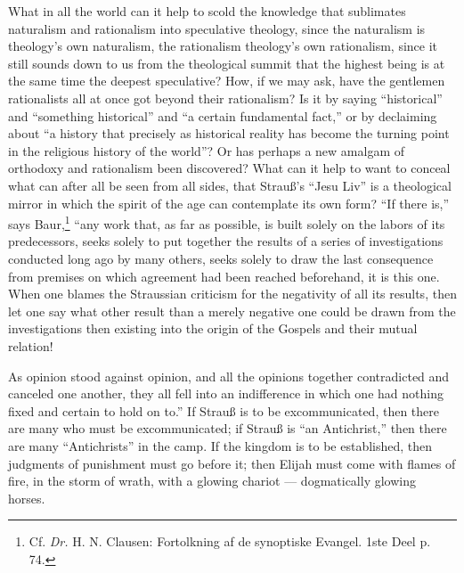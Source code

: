 \documentclass[12pt]{book}
\newcommand{\opage}[1]{\marginnote{\footnotesize\textit{[#1]}}}
\begin{document}
What in all the world can it help to scold the knowledge that sublimates naturalism and rationalism into speculative theology, since the naturalism is theology's own naturalism, the rationalism theology's own rationalism, since it still sounds down to us from the theological summit that the highest being is at the same time the deepest speculative? How, if we may ask, have the gentlemen rationalists all at once got beyond their rationalism? Is it by saying ``historical'' and ``something historical'' and ``a certain fundamental fact,'' or by declaiming about ``a history that precisely as historical reality has become the turning point in the religious history of the world''? Or has perhaps a new amalgam of orthodoxy and rationalism been discovered? What can it help to want to conceal what can after all be seen from all sides, that Strauß's ``Jesu Liv'' is a theological mirror in which the spirit of the age can contemplate its own form? ``If there is,'' says Baur,\footnote{Cf. \textit{Dr.} H. N. Clausen: Fortolkning af de synoptiske Evangel. 1ste Deel p. 74.} ``any work that, as far as possible, is built solely on the labors of its predecessors, seeks solely to put together the results of a series of investigations conducted long ago by many others, seeks solely to draw the last consequence from premises on which agreement had been reached beforehand, it is this one. When one blames the Straussian criticism for the negativity of all its results, then let one say what other result than a merely negative one could be drawn from the investigations then existing into the origin of the Gospels and their mutual relation!

\opage{67}\setcounter{footnote}{0}%
As opinion stood against opinion, and all the opinions together contradicted and canceled one another, they all fell into an indifference in which one had nothing fixed and certain to hold on to.'' If Strauß is to be excommunicated, then there are many who must be excommunicated; if Strauß is ``an Antichrist,'' then there are many ``Antichrists'' in the camp. If the kingdom is to be established, then judgments of punishment must go before it; then Elijah must come with flames of fire, in the storm of wrath, with a glowing chariot --- dogmatically glowing horses.
\end{document}
